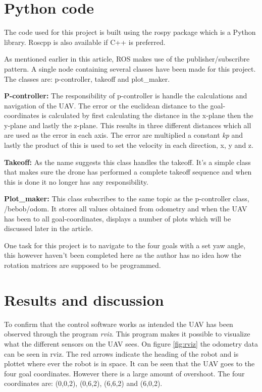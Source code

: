 \documentclass[conference]{IEEEtran}
\begin{document}
\section{Python code}
The code used for this project is built using the rospy package which is a Python library. Roscpp is also available if C++ is preferred. 

As mentioned earlier in this article, ROS makes use of the publisher/subscribre pattern. A single node containing several classes have been made for this project. The classes are: p-controller, takeoff and plot\_maker. 

\textbf{P-controller:} The responsibility of p-controller is handle the calculations and navigation of the UAV. The error or the euclidean distance to the goal-coordinates is calculated by first calculating the distance in the x-plane then the y-plane and lastly the z-plane. This results in three different distances which all are used as the error in each axis. The error are multiplied a constant \textit{kp} and lastly the product of this is used to set the velocity in each direction, x, y and z.

\textbf{Takeoff:} As the name suggests this class handles the takeoff. It's a simple class that makes sure the drone has performed a complete takeoff sequence and when this is done it no longer has any responsibility. 

\textbf{Plot\_maker:} This class subscribes to the same topic as the p-controller class, /bebob/odom. It stores all values obtained from odometry and when the UAV has been to all goal-coordinates, displays a number of plots which will be discussed later in the article. 


One task for this project is to navigate to the four goals with a set yaw angle, this however haven't been completed here as the author has no idea how the rotation matrices are supposed to be programmed. 

\section{Results and discussion}

To confirm that the control software works as intended the UAV has been observed through the program \textit{rviz}. This program makes it possible to visualize what the different sensors on the UAV sees. On figure \ref{fig:rviz} the odometry data can be seen in rviz. The red arrows indicate the heading of the robot and is plottet where ever the robot is in space. It can be seen that the UAV goes to the four goal coordinates. However there is a large amount of overshoot. The four coordinates are: (0,0,2), (0,6,2), (6,6,2) and (6,0,2).
\end{document}
